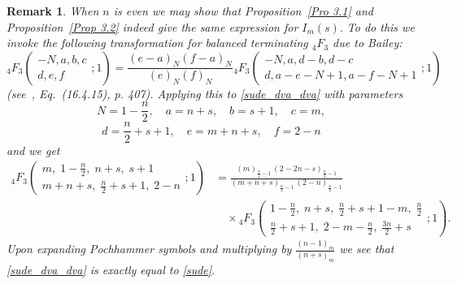\documentclass{article}
\theoremstyle{boldremark}
\newtheorem{remark}[theorem]{Remark}
\renewcommand\[{\begin{equation}}
\renewcommand\]{\end{equation}}
\theoremstyle{definition}
\numberwithin{equation}{section}
\begin{document}
\begin{remark}
    When $n$ is even we may show that Proposition~\ref{Pro 3.1} and Proposition~\ref{Prop 3.2} indeed give the same expression for $I_m(s).$ To do this we invoke the following transformation for balanced terminating $_4F_3$ due to Bailey:
\begin{equation}\label{Bailey}
    {}_4F_3 \left( \begin{matrix} -N, a, b, c \\ d, e, f \end{matrix} ; 1 \right) = \frac{(e-a)_N(f-a)_N}{(e)_N(f)_N} {}_4F_3 \left( \begin{matrix} -N, a, d-b, d-c \\ d, a-e-N+1, a-f-N+1 \end{matrix} ; 1 \right)
\end{equation}
(see~\cite{olver2010nist}, Eq.~(16.4.15), p. 407).
Applying this to \eqref{sude_dva_dva} with parameters
$$N = 1-\frac{n}{2}, \quad a = n+s, \quad b = s+1, \quad c= m,$$
$$d = \frac{n}{2} + s + 1, \quad e = m+n+s, \quad f = 2-n$$
and we get
\begin{align*}
{}_4F_3 \left(
\begin{matrix}
m,\; 1-\frac n2,\; n+s,\; s+1\\[4pt]
m+n+s,\; \frac n2+s+1,\; 2-n
\end{matrix};1
\right)
&=
\frac{
(m)_{\frac n2-1}\,(2-2n-s)_{\frac n2-1}
}{
(m+n+s)_{\frac n2-1}\,(2-n)_{\frac n2-1}
}\\
&\quad \times
{}_4F_3 \left(
\begin{matrix}
1-\frac n2,\; n+s,\; \frac n2+s+1-m,\; \frac n2\\[4pt]
\frac n2+s+1,\; 2-m-\frac n2,\; \frac{3n}{2}+s
\end{matrix};1
\right).
\end{align*}
Upon expanding Pochhammer symbols and multiplying by $\frac{(n-1)_m}{(n+s)_m}$ we see that \eqref{sude_dva_dva} is exactly equal to \eqref{sude}.
\end{remark}
\end{document}
